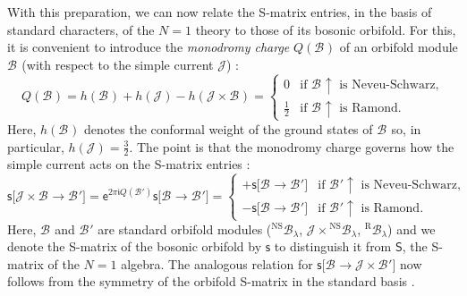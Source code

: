 \documentclass[a4paper,reqno,12pt]{report}
\theoremstyle{definition}
\numberwithin{equation}{section}
\newcommand{\ii}{\mathfrak{i}} %
\newcommand{\ee}{\mathsf{e}}   %
\newcommand{\ra}{\rightarrow}
\newcommand{\modS}{\mathsf{S}} %
\newcommand{\fuse}{\mathbin{\times}}                                            %
\newcommand{\ns}{Neveu-Schwarz}
\theoremstyle{plain}
\newcommand{\Mod}[1]{\mathcal{#1}}                 %
\newcommand{\Ind}[1]{#1 {\uparrow}}   %
\newcommand{\OrbmodS}{\mathsf{s}} %
\newcommand{\OrbSmat}[2]{\OrbmodS \bigl[ #1 \ra #2 \bigr]}  %
\newcommand{\Orb}[1]{\Mod{B}_{#1}}                 %
\newcommand{\NSOrb}[1]{{}^{\text{NS}}\Orb{#1}}     %
\newcommand{\ROrb}[1]{{}^{\text{R}}\Orb{#1}}       %
\begin{document}
With this preparation, we can now relate the S-matrix entries, in the basis of standard characters, of the $N=1$ theory to those of its bosonic orbifold.  For this, it is convenient to introduce the \emph{monodromy charge} $Q(\Orb{})$ of an orbifold module $\Orb{}$ (with respect to the simple current $\Mod{J}$) \cite{SchExt89}:
\begin{equation}
Q(\Orb{}) = h(\Orb{}) + h(\Mod{J}) - h(\Mod{J} \fuse \Orb{}) =
\begin{cases}
0 & \text{if \(\Ind{\Orb{}}\) is \ns{},} \\
\frac{1}{2} & \text{if \(\Ind{\Orb{}}\) is Ramond.}
\end{cases}
\end{equation}
Here, $h(\Orb{})$ denotes the conformal weight of the ground states of $\Orb{}$ so, in particular, $h(\Mod{J}) = \frac{3}{2}$.  The point is that the monodromy charge governs how the simple current acts on the S-matrix entries \cite{SchSimp90}:
\begin{equation} \label{eq:SConSMat}
\OrbSmat{\Mod{J} \fuse \Orb{}}{\Orb{}'} = \ee^{2 \pi \ii Q(\Orb{}')} \OrbSmat{\Orb{}}{\Orb{}'} =
\begin{cases}
+\OrbSmat{\Orb{}}{\Orb{}'} & \text{if \(\Ind{\Orb{}'}\) is \ns{},} \\
-\OrbSmat{\Orb{}}{\Orb{}'} & \text{if \(\Ind{\Orb{}'}\) is Ramond.}
\end{cases}
\end{equation}
Here, $\Orb{}$ and $\Orb{}'$ are standard orbifold modules ($\NSOrb{\lambda}$, $\Mod{J} \fuse \NSOrb{\lambda}$, $\ROrb{\lambda}$) and we denote the S-matrix of the bosonic orbifold by $\OrbmodS$ to distinguish it from $\modS$, the S-matrix of the $N=1$ algebra.  The analogous relation for $\OrbSmat{\Orb{}}{\Mod{J} \times \Orb{}'}$ now follows from the symmetry of the orbifold S-matrix in the standard basis \cite{RidVer14}.
\end{document}
